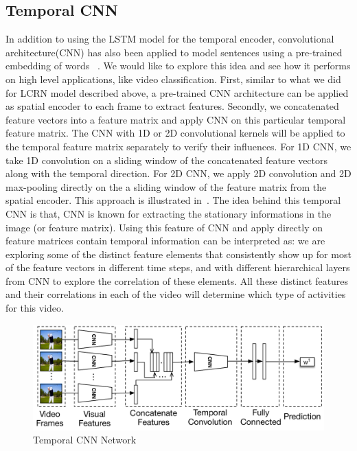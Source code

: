 \subsection{Temporal CNN}
In addition to using the LSTM model for the temporal encoder, convolutional architecture(CNN) has also been applied to model sentences using a pre-trained embedding of words ~\cite{cnnSC,cnnMNLS}. We would like to explore this idea and see how it performs on high level applications, like video classification. First, similar to what we did for LCRN model described above, a pre-trained CNN architecture can be applied as spatial encoder to each frame to extract features. 
Secondly, we concatenated feature vectors into a feature matrix and apply CNN on this particular temporal feature matrix. The CNN with 1D or 2D convolutional kernels will be applied to the temporal feature matrix separately to verify their influences. For 1D CNN, we take 1D convolution on a sliding window of the concatenated feature vectors along with the temporal direction. For 2D CNN, we apply 2D convolution and 2D max-pooling directly on the a sliding window of the feature matrix from the spatial encoder. This approach is illustrated in~.
The idea behind this temporal CNN is that, CNN is known for extracting the stationary informations in the image (or feature matrix). Using this feature of CNN and apply directly on feature matrices contain temporal information can be interpreted as: we are exploring some of the distinct feature elements that consistently show up for most of the feature vectors in different time steps, and with different hierarchical layers from CNN to explore the correlation of these elements. All these distinct features and their correlations in each of the video will determine which type of activities for this video. 

\begin{figure}
  \centering
  \includegraphics[width=1.0\linewidth]{figs/tnn}
  \caption{Temporal CNN Network}
  \label{fig:tnn}
\end{figure}

